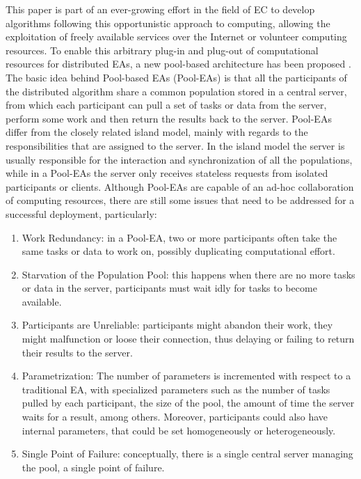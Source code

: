 This paper is part of an ever-growing effort in the field of EC to develop algorithms following this opportunistic approach to computing, allowing the exploitation of freely available services over the Internet or volunteer computing resources. To enable this arbitrary plug-in and plug-out of computational resources for distributed EAs, a new pool-based architecture has been proposed \cite{sofea1,sofea2,sofea3,PoolvsIsland,Evospace,Musart,FreeLunch,Fire}.
The basic idea behind Pool-based EAs (Pool-EAs) is that all the participants of the distributed algorithm share a common population stored in a central server, from which each participant can pull a set of tasks or data from the server, perform some work and then return the results back to the server. Pool-EAs differ from the closely related island model, mainly with regards to the responsibilities that are assigned to the server.
In the island model the server is usually responsible for the interaction and synchronization of all the populations,
while in a Pool-EAs the server only receives stateless requests from isolated participants or clients. 
Although Pool-EAs are capable of an ad-hoc collaboration of computing resources, there are still some issues that need to be addressed for a successful deployment, particularly:
\begin{enumerate}
	\item Work Redundancy: in a Pool-EA, two or more participants often take the same tasks or data to work on, possibly duplicating
	computational effort.
	\item Starvation of the Population Pool: this happens when there are no more tasks or data in the server, participants must wait idly for tasks to become available.
	  
	
	\item Participants are Unreliable: participants might abandon their work, they might malfunction or loose their connection, thus delaying or failing to return their results to the server.
	\item Parametrization: The number of parameters is incremented with respect to a traditional EA, with specialized parameters such as the number of tasks pulled by each participant, the size of the pool, the amount of time the server waits for a result, among others. Moreover, participants could also have internal parameters, that could be set homogeneously or heterogeneously.
	\item Single Point of Failure: conceptually, there is a single central server managing the pool, a single point of failure.  	
\end{enumerate}
        
